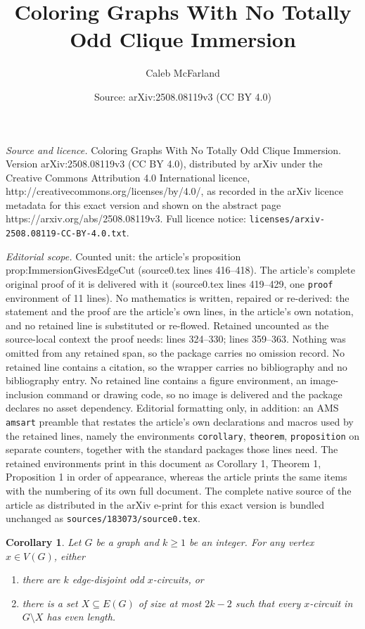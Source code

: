 \documentclass[10pt,a4paper]{amsart}
\title{Coloring Graphs With No Totally Odd Clique Immersion}
\author{Caleb McFarland}
\date{Source: arXiv:2508.08119v3 (CC BY 4.0)}
\newtheorem{corollary}{Corollary}
\begin{document}
\maketitle

\noindent\emph{Source and licence.} Coloring Graphs With No Totally Odd Clique Immersion. Version arXiv:2508.08119v3 (CC BY 4.0), distributed by arXiv under the Creative Commons Attribution 4.0 International licence, http://creativecommons.org/licenses/by/4.0/, as recorded in the arXiv licence metadata for this exact version and shown on the abstract page https://arxiv.org/abs/2508.08119v3. Full licence notice: \texttt{licenses/arxiv-2508.08119-CC-BY-4.0.txt}.\par\smallskip

\noindent\textit{Editorial scope.} Counted unit: the article's proposition prop:ImmersionGivesEdgeCut (source0.tex lines 416--418). The article's complete original proof of it is delivered with it (source0.tex lines 419--429, one \texttt{proof} environment of 11 lines). No mathematics is written, repaired or re-derived: the statement and the proof are the article's own lines, in the article's own notation, and no retained line is substituted or re-flowed.  Retained uncounted as the source-local context the proof needs: lines 324--330; lines 359--363.  Nothing was omitted from any retained span, so the package carries no omission record.  No retained line contains a citation, so the wrapper carries no bibliography and no bibliography entry.  No retained line contains a figure environment, an image-inclusion command or drawing code, so no image is delivered and the package declares no asset dependency.  Editorial formatting only, in addition: an AMS \texttt{amsart} preamble that restates the article's own declarations and macros used by the retained lines, namely the environments \texttt{corollary}, \texttt{theorem}, \texttt{proposition} on separate counters, together with the standard packages those lines need.  The retained environments print in this document as Corollary 1, Theorem 1, Proposition 1 in order of appearance, whereas the article prints the same items with the numbering of its own full document.  The complete native source of the article as distributed in the arXiv e-print for this exact version is bundled unchanged as \texttt{sources/183073/source0.tex}.
\begin{corollary}\label{cor:OddCircuitsEP}
    Let $G$ be a graph and $k \geq 1$ be an integer. For any vertex $x \in V(G)$, either
    \begin{enumerate}
        \item there are $k$ edge-disjoint odd $x$-circuits, or
        \item there is a set $X \subseteq E(G)$ of size at most $2k-2$ such that every $x$-circuit in $G \setminus X$ has even length.
    \end{enumerate}
\end{corollary}
\end{document}
